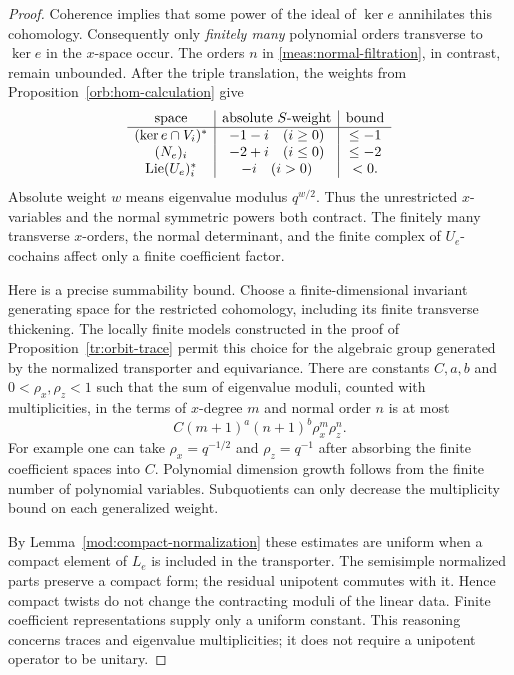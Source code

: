 \begin{proof}
Coherence implies that some power of the ideal of $\ker e$ annihilates
this cohomology.  Consequently only \emph{finitely many} polynomial orders
transverse to $\ker e$ in the $x$-space occur.  The orders $n$ in
\eqref{meas:normal-filtration}, in contrast, remain unbounded.
After the triple translation, the weights from
Proposition~\ref{orb:hom-calculation} give
\[
 \begin{array}{c|c|c}
 \text{space}&\text{absolute }S\text{-weight}&\text{bound}\\ \hline
 (\ker e\cap V_i)^*&-1-i\quad(i\geq0)&\leq-1\\
 (N_e)_i&-2+i\quad(i\leq0)&\leq-2\\
 \operatorname{Lie}(U_e)_i^*&-i\quad(i>0)&<0.
 \end{array}
\]
Absolute weight $w$ means eigenvalue modulus $q^{w/2}$.  Thus the
unrestricted $x$-variables and the normal symmetric powers both contract.
The finitely many transverse $x$-orders, the normal determinant, and the
finite complex of $U_e$-cochains affect only a finite coefficient factor.

Here is a precise summability bound.  Choose a finite-dimensional invariant
generating space for the restricted cohomology, including its finite
transverse thickening.  The locally finite models constructed in the proof of
Proposition~\ref{tr:orbit-trace} permit this choice for
the algebraic group generated by the normalized transporter and
equivariance.  There are constants $C,a,b$ and $0<\rho_x,\rho_z<1$ such
that the sum of eigenvalue moduli, counted with multiplicities, in the
terms of $x$-degree $m$ and normal order $n$ is at most
\begin{equation}\label{meas:geometric-bound}
 C(m+1)^a(n+1)^b\rho_x^m\rho_z^n.
\end{equation}
For example one can take $\rho_x=q^{-1/2}$ and $\rho_z=q^{-1}$ after
absorbing the finite coefficient spaces into $C$.  Polynomial dimension
growth follows from the finite number of polynomial variables.  Subquotients
can only decrease the multiplicity bound on each generalized weight.

By Lemma~\ref{mod:compact-normalization} these estimates are uniform when a
compact element of $L_e$ is included in the transporter.  The semisimple
normalized parts preserve a compact form; the residual unipotent commutes
with it.  Hence compact twists do not change the contracting moduli of the
linear data.  Finite coefficient representations supply only a uniform
constant.  This reasoning concerns traces and eigenvalue multiplicities;
it does not require a unipotent operator to be unitary.


\end{proof}
